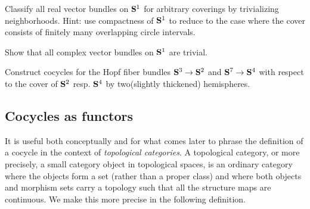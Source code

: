 \documentclass[a4paper,openany]{scrbook}
\begin{document}
\begin{exer} \label{exer:bundlesons1}
Classify all real vector bundles on $\S^1$ for arbitrary coverings by trivializing neighborhoods. Hint: use compactness of $\S^1$ to reduce to the case where the cover consists of finitely many overlapping circle intervals.
\end{exer}

\begin{exer} \label{exer:complexbundlesons1}
Show that all complex vector bundles on $\S^1$ are trivial.
\end{exer}

\begin{exer}
Construct cocycles for the Hopf fiber bundles $\S^3 \to \S^2$ and $\S^7 \to \S^4$ with respect to the cover of $\S^2$ resp. $\S^4$ by two(slightly thickened) hemispheres.
\end{exer}

\subsection{Cocycles as functors} \label{subsec:cocyclesasfunctors}

It is useful both conceptually and for what comes later to phrase the definition of a cocycle in the context of \emph{topological categories}. A topological category, or more precisely, a small category object in topological spaces, is an ordinary category where the objects form a set (rather than a proper class) and where both objects and morphism sets carry a topology such that all the structure maps are continuous. We make this more precise in the following definition.
\end{document}
